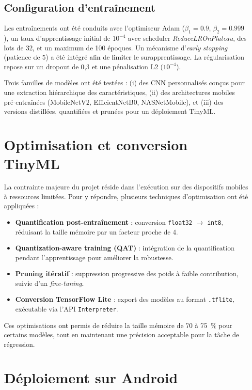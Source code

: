 \subsection{Configuration d’entraînement}
Les entraînements ont été conduits avec l’optimiseur Adam ($\beta_1=0.9$, $\beta_2=0.999$), un taux d’apprentissage initial de $10^{-4}$ avec scheduler \emph{ReduceLROnPlateau}, des lots de 32, et un maximum de 100 époques. Un mécanisme d’\emph{early stopping} (patience de 5) a été intégré afin de limiter le surapprentissage. La régularisation repose sur un dropout de 0,3 et une pénalisation L2 ($10^{-4}$).

Trois familles de modèles ont été testées : (i) des CNN personnalisés conçus pour une extraction hiérarchique des caractéristiques, (ii) des architectures mobiles pré-entraînées (MobileNetV2, EfficientNetB0, NASNetMobile), et (iii) des versions distillées, quantifiées et prunées pour un déploiement TinyML.

\section{Optimisation et conversion TinyML}
\label{sec:optimisation_tinyml}

La contrainte majeure du projet réside dans l’exécution sur des dispositifs mobiles à ressources limitées. Pour y répondre, plusieurs techniques d’optimisation ont été appliquées :

\begin{itemize}
\item \textbf{Quantification post-entraînement} : conversion \texttt{float32} $\rightarrow$ \texttt{int8}, réduisant la taille mémoire par un facteur proche de 4.
\item \textbf{Quantization-aware training (QAT)} : intégration de la quantification pendant l’apprentissage pour améliorer la robustesse.
\item \textbf{Pruning itératif} : suppression progressive des poids à faible contribution, suivie d’un \emph{fine-tuning}.
\item \textbf{Conversion TensorFlow Lite} : export des modèles au format \texttt{.tflite}, exécutable via l’API \texttt{Interpreter}.
\end{itemize}

Ces optimisations ont permis de réduire la taille mémoire de 70 à 75~\% pour certains modèles, tout en maintenant une précision acceptable pour la tâche de régression.

\section{Déploiement sur Android}
\label{sec:deploiement_android}

